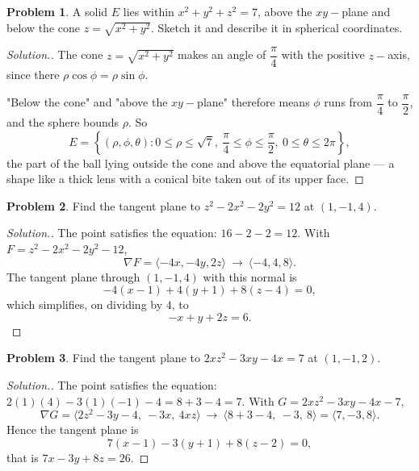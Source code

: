 \documentclass[11pt,a4paper]{article}
\theoremstyle{definition}
\newtheorem{problemx}{Problem}[subsection]
\newenvironment{problem}{\begin{problemx}}{\end{problemx}}
\newenvironment{solution}
  {\renewcommand{\qedsymbol}{}\begin{proof}[\textit{Solution}.]}
  {\end{proof}}
\begin{document}
\begin{problem}
A solid $E$ lies within $x^2+y^2+z^2 = 7$, above the $xy-$plane and below the
cone $z = \sqrt{x^2+y^2}$. Sketch it and describe it in spherical coordinates.
\end{problem}
\begin{solution}
The cone $z = \sqrt{x^2+y^2}$ makes an angle of $\dfrac{\pi}{4}$ with the
positive $z-$axis, since there $\rho\cos\phi = \rho\sin\phi$.

"Below the cone" and "above the $xy-$plane" therefore means $\phi$ runs from
$\dfrac{\pi}{4}$ to $\dfrac{\pi}{2}$, and the sphere bounds $\rho$. So
\[E = \left\{(\rho,\phi,\theta): 0\leq\rho\leq\sqrt7,\
\frac{\pi}{4}\leq\phi\leq\frac{\pi}{2},\ 0\leq\theta\leq 2\pi\right\},\]
the part of the ball lying outside the cone and above the equatorial plane ---
a shape like a thick lens with a conical bite taken out of its upper face.
\end{solution}

\begin{problem}
Find the tangent plane to $z^2-2x^2-2y^2 = 12$ at $(1,-1,4)$.
\end{problem}
\begin{solution}
The point satisfies the equation: $16-2-2 = 12$. With
$F = z^2-2x^2-2y^2-12$,
\[\nabla F = \langle -4x, -4y, 2z\rangle
\ \longrightarrow\ \langle -4, 4, 8\rangle .\]
The tangent plane through $(1,-1,4)$ with this normal is
\[-4(x-1) + 4(y+1) + 8(z-4) = 0 ,\]
which simplifies, on dividing by $4$, to
\[-x + y + 2z = 6 .\]
\end{solution}

\begin{problem}
Find the tangent plane to $2xz^2-3xy-4x = 7$ at $(1,-1,2)$.
\end{problem}
\begin{solution}
The point satisfies the equation: $2(1)(4) - 3(1)(-1) - 4 = 8+3-4 = 7$. With
$G = 2xz^2-3xy-4x-7$,
\[\nabla G = \langle 2z^2-3y-4,\ -3x,\ 4xz\rangle
\ \longrightarrow\ \langle 8+3-4,\ -3,\ 8\rangle = \langle 7,-3,8\rangle .\]
Hence the tangent plane is
\[7(x-1) - 3(y+1) + 8(z-2) = 0 ,\]
that is $7x-3y+8z = 26$.
\end{solution}
\end{document}
